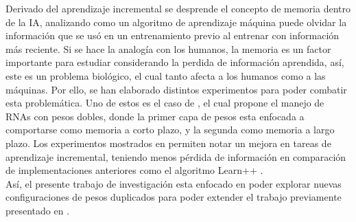     Derivado del aprendizaje incremental se desprende el concepto de memoria dentro de la IA, analizando 
    como un algoritmo de aprendizaje máquina puede olvidar la información que se us\'o en un entrenamiento 
    previo al entrenar con información más reciente. Si se hace la analogía con los humanos, la memoria 
    es un factor importante para estudiar considerando la perdida de información aprendida, así, este es un 
    problema biol\'ogico, el cual tanto afecta a los humanos como a las m\'aquinas. Por ello, se han 
    elaborado distintos experimentos para poder combatir esta problemática. Uno de estos es el 
    caso de \cite{bullinaria2009}, el cual propone el manejo de RNAs con pesos dobles, donde la 
    primer capa de pesos esta enfocada a comportarse como memoria a corto plazo, y la segunda como memoria 
    a largo plazo.  Los experimentos mostrados en \cite{bullinaria2009} permiten notar un mejora en tareas 
    de aprendizaje incremental, teniendo menos p\'erdida de información en comparación de implementaciones
    anteriores como el algoritmo  Learn++ \cite{li2008, Elwell2011}.\\

    Así, el presente trabajo de investigación esta enfocado en poder explorar nuevas configuraciones 
    de pesos duplicados para poder extender el trabajo previamente presentado en \cite{bullinaria2009}.







